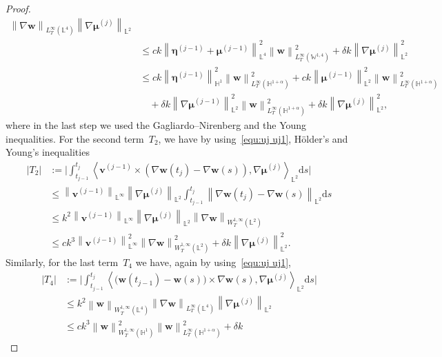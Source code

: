 \documentclass[10pt,a4paper]{amsart}
\newcommand{\bb}{\mathbb}
\newcommand{\bff}{\boldsymbol}
\newcommand{\ds}{\mathrm{d}s}
\newcommand{\inpro}[2]{\left\langle#1,#2\right\rangle}
\newcommand{\nn}{\nonumber}
\newcommand{\norm}[2]{\left\|{#1}\right\|_{#2}}
\begin{document}
\begin{proof}
\begin{align*}
		\norm{\nabla\bff{w}}{L^\infty_T(\bb{L}^4)}
		\norm{\nabla\bff{\mu}^{(j)}}{\bb{L}^2}
		\\
		&\le
		c k
		\norm{\bff{\eta}^{(j-1)} + \bff{\mu}^{(j-1)}}{\bb{L}^4}^2
		\norm{\bff{w}}{L^\infty_T(\bb{W}^{1,4})}^2
		+
		\delta k
		\norm{\nabla\bff{\mu}^{(j)}}{\bb{L}^2}^2
		\\
		&\leq
		ck \norm{\bff{\eta}^{(j-1)}}{\bb{H}^1}^2  \norm{\bff{w}}{L^\infty_T(\bb{H}^{1+\alpha})}^2
			+
			ck \norm{\bff{\mu}^{(j-1)}}{\bb{L}^2}^2 \norm{\bff{w}}{L^\infty_T(\bb{H}^{1+\alpha})}^2
		\\
		&\quad
		+
			\delta k \norm{\nabla \bff{\mu}^{(j-1)}}{\bb{L}^2}^2 \norm{\bff{w}}{L^\infty_T(\bb{H}^{1+\alpha})}^2
			+
			\delta k \norm{\nabla \bff{\mu}^{(j)}}{\bb{L}^2}^2,
	\end{align*}
	where in the last step we used the Gagliardo--Nirenberg and the Young inequalities.
	For the second term~$T_2$, we have by using~\eqref{equ:uj uj1},
	H\"older's and Young's inequalities
	\begin{align}\label{equ:est T2} 
		|T_2|
		&:=
		\Big|
		\int_{t_{j-1}}^{t_j} 
		\inpro{\bff{v}^{(j-1)} \times (\nabla\bff{w}(t_j) -
			\nabla\bff{w}(s))}{\nabla\bff{\mu}^{(j)}}_{\bb{L}^2} \ds
		\Big|
		\nn\\
		&\le
		\norm{\bff{v}^{(j-1)}}{\bb{L}^\infty}
		\norm{\nabla\bff{\mu}^{(j)}}{\bb{L}^2}
		\int_{t_{j-1}}^{t_j} 
		\norm{\nabla\bff{w}(t_j)-\nabla\bff{w}(s)}{\bb{L}^2} \ds
		\nn\\
		&\le
		k^2  
		\norm{\bff{v}^{(j-1)}}{\bb{L}^\infty}
		\norm{\nabla\bff{\mu}^{(j)}}{\bb{L}^2}
		\norm{\nabla\bff{w}}{W^{1,\infty}_T(\bb{L}^2)} 
		\nn\\
		&\le
		ck^3
			\norm{\bff{v}^{(j-1)}}{\bb{L}^\infty}^2
			\norm{\nabla\bff{w}}{W^{1,\infty}_T(\bb{L}^2)}^2
			+
			\delta k
			\norm{\nabla\bff{\mu}^{(j)}}{\bb{L}^2}^2.
	\end{align}
	Similarly, for the last term~$T_4$ we have, again by using~\eqref{equ:uj uj1},
	\begin{align*} 
		|T_4|
		&:=
		\Big|
		\int_{t_{j-1}}^{t_j} 
		\inpro{
			\big(\bff{w}(t_{j-1})-\bff{w}(s)\big) \times \nabla\bff{w}(s)}
		{\nabla\bff{\mu}^{(j)}}_{\bb{L}^2} \ds
		\Big|
		\\
		&\le
		k^2 \norm{\bff{w}}{W^{1,\infty}_T(\bb{L}^4)} 
		\norm{\nabla\bff{w}}{L^\infty_T(\bb{L}^4)} 
		\norm{\nabla\bff{\mu}^{(j)}}{\bb{L}^2}
		\\
		&\le
		ck^3
			\norm{\bff{w}}{W^{1,\infty}_T(\bb{H}^1)}^2
			\norm{\bff{w}}{L^\infty_T(\bb{H}^{1+\alpha})}^2
			+
			\delta k

\end{align*}
\end{proof}
\end{document}
